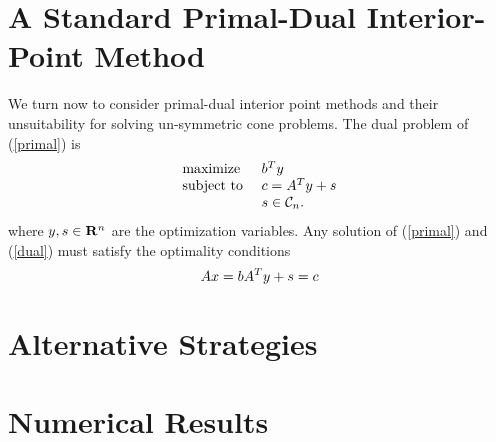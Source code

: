 \documentclass{article}
\begin{document}
\section{A Standard Primal-Dual Interior-Point Method}
We turn now to consider primal-dual interior point methods and their unsuitability for
solving un-symmetric cone problems. The dual problem of (\ref{primal}) is 
\begin{equation}\label{dual}
  \begin{array}{ll}
    \mbox{maximize}    & b^Ty \\
    \mbox{subject to } & c= A^Ty + s\\
                       & s \in \mathcal{C}_n. 
  \end{array}
\end{equation}
where $y,s\in \mathbf{R}^n$ are the optimization variables. Any solution of (\ref{primal}) and (\ref{dual})
must satisfy the optimality conditions
\begin{equation}\label{optcond}
  Ax = b\\
  A^Ty + s = c\\
\end{equation}

\section{Alternative Strategies}

\section{Numerical Results}
\end{document}
